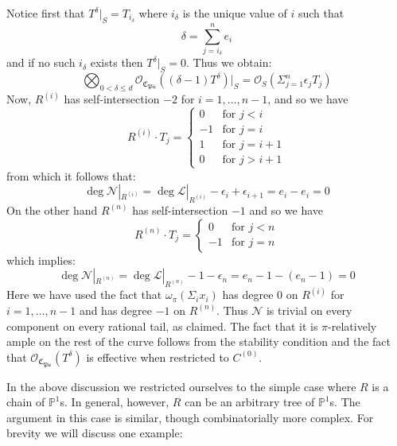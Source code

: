 \documentclass[11pt]{amsart}
\newcommand{\PP}{\mathbb P}
\newcommand{\OO}{\mathcal{O}}
\theoremstyle{definition}
\theoremstyle{definition}
\begin{document}
Notice first that $T^\delta|_S = T_{i_\delta}$ where $i_\delta$ is the unique value of $i$ such that
\begin{equation*} \delta = \sum_{j=i_{\delta}}^n e_i \end{equation*}
and if no such $i_\delta$ exists then $T^\delta|_S = 0$. Thus we obtain:
\begin{equation*} \bigotimes_{0<\delta\leq d}\mathcal{O}_{\mathfrak{C}_{\mathfrak{Pic}}}((\delta-1) T^\delta)|_S = \mathcal{O}_S(\Sigma_{j=1}^n \epsilon_j T_j) \end{equation*}
Now, $R^{(i)}$ has self-intersection $-2$ for $i=1,\ldots,n-1$, and so we have
\begin{equation*}
R^{(i)}\cdot T_j =
  \begin{cases}
    0 & \text{for } j<i \\
    -1 & \text{for } j=i \\
    1 & \text{for } j=i+1 \\
    0 & \text{for } j>i+1
  \end{cases}
\end{equation*}
from which it follows that:
\begin{equation*} \deg \mathcal{N}|_{R^{(i)}} = \deg \mathcal{L}|_{R^{(i)}} - \epsilon_i + \epsilon_{i+1} = e_i - e_i = 0 \end{equation*}
On the other hand $R^{(n)}$ has self-intersection $-1$ and so we have
\begin{equation*}
R^{(n)} \cdot T_j =
\begin{cases}
0 & \text{for } j < n \\
-1 & \text{for } j = n
\end{cases}
\end{equation*}
which implies:
\begin{equation*} \deg \mathcal{N}|_{R^{(n)}} = \deg \mathcal{L}|_{R^{(n)}} - 1 - \epsilon_n = e_n - 1 - (e_n-1) = 0\end{equation*}
Here we have used the fact that $\omega_\pi(\Sigma_i x_i)$ has degree $0$ on $R^{(i)}$ for $i=1,\ldots,n-1$ and has degree $-1$ on $R^{(n)}$. Thus $\mathcal{N}$ is trivial on every component on every rational tail, as claimed. The fact that it is $\pi$-relatively ample on the rest of the curve follows from the stability condition and the fact that $\OO_{\mathfrak{C}_{\mathfrak{Pic}}}(T^\delta)$ is effective when restricted to $C^{(0)}$.

In the above discussion we restricted ourselves to the simple case where $R$ is a chain of $\PP^1$s. In general, however, $R$ can be an arbitrary tree of $\PP^1$s. The argument in this case is similar, though combinatorially more complex. For brevity we will discuss one example:
\end{document}
